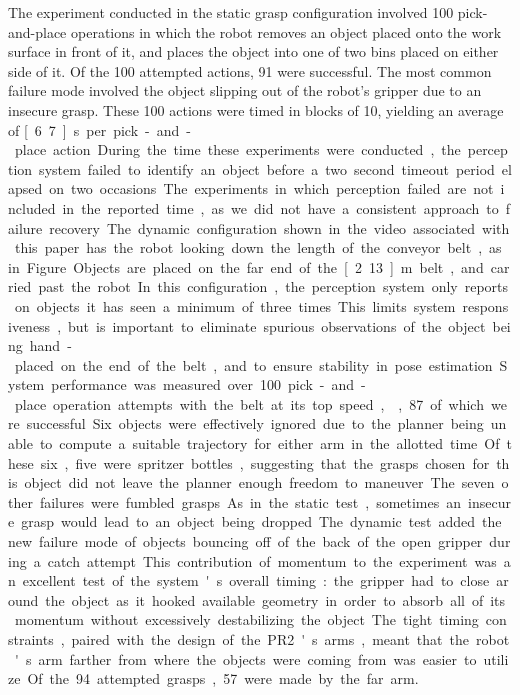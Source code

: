\documentclass[letterpaper, 10 pt, conference]{ieeeconf}  %
\begin{document}
The experiment conducted in the static grasp configuration involved
100 pick-and-place operations in which the robot removes an object
placed onto the work surface in front of it, and places the object
into one of two bins placed on either side of it. Of the 100 attempted
actions, 91 were successful. The most common failure mode involved the
object slipping out of the robot's gripper due to an insecure
grasp. These 100 actions were timed in blocks of 10, yielding an
average of \unit[6.7]{s} per pick-and-place action. During the time
these experiments were conducted, the perception system failed to
identify an object before a two second timeout period elapsed on two
occasions. The experiments in which perception failed are not included
in the reported time, as we did not have a consistent approach to
failure recovery.

The dynamic configuration shown in the video associated with this
paper has the robot looking down the length of the conveyor belt, as
in Figure. Objects are placed on the far end of
the \unit[2.13]{m} belt, and carried past the robot. In this
configuration, the perception system only reports on objects it has
seen a minimum of three times. This limits system responsiveness, but
is important to eliminate spurious observations of the object being
hand-placed on the end of the belt, and to ensure stability in pose
estimation.

System performance was measured over 100 pick-and-place operation
attempts with the belt at its top speed, , 87
of which were successful. Six objects were effectively ignored due to
the planner being unable to compute a suitable trajectory for either
arm in the allotted time. Of these six, five were spritzer bottles,
suggesting that the grasps chosen for this object did not leave the
planner enough freedom to maneuver. The seven other failures were
fumbled grasps. As in the static test, sometimes an insecure grasp
would lead to an object being dropped. The dynamic test added the new
failure mode of objects bouncing off of the back of the open gripper
during a catch attempt. This contribution of momentum to the
experiment was an excellent test of the system's overall timing: the
gripper had to close around the object as it hooked available geometry
in order to absorb all of its momentum without excessively
destabilizing the object. The tight timing constraints, paired with
the design of the PR2's arms, meant that the robot's arm farther from
where the objects were coming from was easier to utilize. Of the 94
attempted grasps, 57 were made by the far arm.
\end{document}
